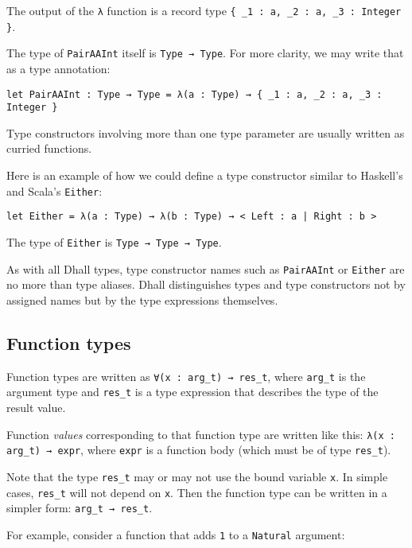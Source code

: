 The output of the \lstinline!λ! function is a record type \lstinline!{ _1 : a, _2 : a, _3 : Integer }!.


The type of \lstinline!PairAAInt! itself is \lstinline!Type → Type!.
For more clarity, we may write that as a type annotation:


\begin{lstlisting}[language=Dhall]
let PairAAInt : Type → Type = λ(a : Type) → { _1 : a, _2 : a, _3 : Integer }
\end{lstlisting}


Type constructors involving more than one type parameter are usually written as curried functions.


Here is an example of how we could define a type constructor similar to Haskell's and Scala's \lstinline!Either!:


\begin{lstlisting}[language=Dhall]
let Either = λ(a : Type) → λ(b : Type) → < Left : a | Right : b >
\end{lstlisting}


The type of \lstinline!Either! is \lstinline!Type → Type → Type!.


As with all Dhall types, type constructor names such as \lstinline!PairAAInt! or \lstinline!Either! are no more than type aliases.
Dhall distinguishes types and type constructors not by assigned names but by the type expressions themselves.


\subsection{Function types}


Function types are written as \lstinline!∀(x : arg_t) → res_t!, where \lstinline!arg_t! is the argument type and \lstinline!res_t! is a type expression that describes the type of the result value.


Function \emph{values} corresponding to that function type are written like this: \lstinline!λ(x : arg_t) → expr!, where \lstinline!expr! is a function body (which must be of type \lstinline!res_t!).


Note that the type \lstinline!res_t! may or may not use the bound variable \lstinline!x!.
In simple cases, \lstinline!res_t! will not depend on \lstinline!x!.
Then the function type can be written in a simpler form: \lstinline!arg_t → res_t!.


For example, consider a function that adds \lstinline!1! to a \lstinline!Natural! argument:



